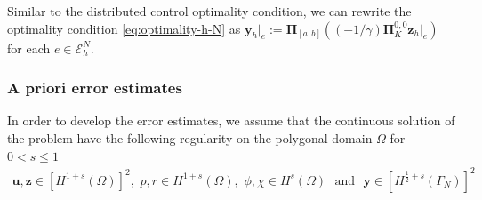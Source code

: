\documentclass[smallextended]{svjour3}
\numberwithin{equation}{section}
\numberwithin{figure}{section}
\numberwithin{table}{section}
\newcommand\cero{{\boldsymbol{0}}}
\newcommand\bV{\mathbf{V}}
\newcommand\bPi{\boldsymbol{\Pi}}
\newcommand\ff{\boldsymbol{f}}
\newcommand\bx{\boldsymbol{x}}
\newcommand\by{\boldsymbol{y}}
\newcommand\bu{\boldsymbol{u}}
\newcommand\bv{\boldsymbol{v}}
\newcommand\bz{\boldsymbol{z}}
\newcommand{\bY}{\boldsymbol{Y}}
\newcommand\cT{\mathcal{T}}
\begin{document}
    \noindent Similar to the distributed control optimality condition, we can rewrite the optimality condition \eqref{eq:optimality-h-N} as $\by_h|_e:= \bPi_{[a,b]} \left((-1/\gamma) \bPi^{0,0}_K \bz_h|_e  \right)$ for each $e \in \mathcal{E}_h^N$.
    

    \subsubsection{A priori error estimates}
    In order to develop the error estimates, we assume that the continuous solution of the problem have the following regularity on the polygonal domain $\Omega$ for $0 < s \le 1$ 
    \begin{gather} \label{reg}
        \bu, \bz \in [H^{1+s}(\Omega)]^2, \,\, p, r \in H^{1+s}(\Omega), \,\,
        \phi, \chi \in H^s(\Omega) \,\, \text{ and } \,\, \by \in [H^{\frac{1}{2} +s }(\Gamma_N)]^2 
    \end{gather}
\end{document}
